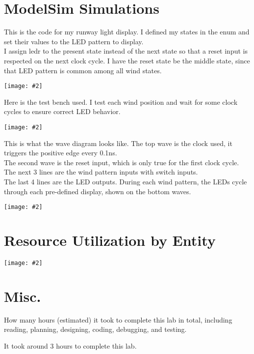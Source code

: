 \documentclass{article}
\newenvironment{solution}{\begin{mdframed}[style=SolutionFrame]}{\end{mdframed}}
\newcommand{\img}[2][0.9]{
    \begin{minipage}[t]{0.9\linewidth}
        \begin{center}
            \texttt{[image: \#2]}
        \end{center}
    \end{minipage}
}
\begin{document}
\section{ModelSim Simulations}
    \begin{solution}
        This is the code for my runway light display.
        I defined my states in the enum and set their values to the LED pattern to display. \\
        I assign ledr to the present state instead of the next state so that a reset input is respected on the next clock cycle. I have the reset state be the middle state, since that LED pattern is common among all wind states. \\
        \img{runway.png}

        \newpage
        Here is the test bench used. I test each wind position and wait for some clock cycles to ensure correct LED behavior.
        \\
        \img{runway_tb.png}

        \newpage
        This is what the wave diagram looks like. The top wave is the clock used, it triggers the positive edge every 0.1ns. \\
        The second wave is the reset input, which is only true for the first clock cycle. \\
        The next 3 lines are the wind pattern inputs with switch inputs. \\
        The last 4 lines are the LED outputs. During each wind pattern, the LEDs cycle through each pre-defined display, shown on the bottom waves.
        \\
        \img[1.1]{waves.png}
    \end{solution}

\section{Resource Utilization by Entity}
    \img[1.1]{resource_utilization_by_entity.png}

\section{Misc.}
    How many hours (estimated) it took to complete this lab in total, including reading, planning, designing, coding, debugging, and testing.
    \begin{solution}
        It took around 3 hours to complete this lab.
    \end{solution}
\end{document}
